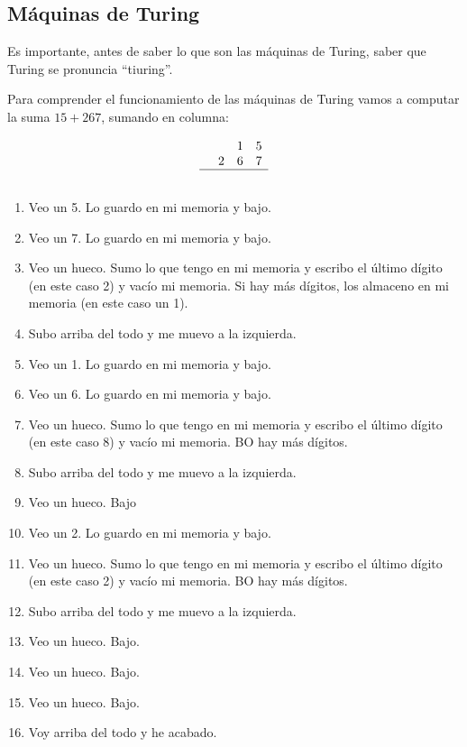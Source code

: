 
\subsection{Máquinas de Turing}

Es importante, antes de saber lo que son las máquinas de Turing, saber que Turing se pronuncia ``tiuring''.

\begin{example}
Para comprender el funcionamiento de las máquinas de Turing vamos a computar la suma $15 + 267$, sumando en columna:

\[
\begin{array}{cccc}
&&1&5\\
&2&6&7\\\hline
&&&
\end{array}
\]

\begin{enumerate}
	\item Veo un 5. Lo guardo en mi memoria y bajo.
	\item Veo un 7. Lo guardo en mi memoria y bajo.
	\item Veo un hueco. Sumo lo que tengo en mi memoria y escribo el último dígito (en este caso 2) y vacío mi memoria. Si hay más dígitos, los almaceno en mi memoria (en este caso un 1).
	\item Subo arriba del todo y me muevo a la izquierda.
	\item Veo un 1. Lo guardo en mi memoria y bajo.
	\item Veo un 6. Lo guardo en mi memoria y bajo.
	\item Veo un hueco. Sumo lo que tengo en mi memoria y escribo el último dígito (en este caso 8) y vacío mi memoria. BO hay más dígitos.
	\item Subo arriba del todo y me muevo a la izquierda.
	\item Veo un hueco. Bajo
	\item Veo un 2. Lo guardo en mi memoria y bajo.
	\item Veo un hueco. Sumo lo que tengo en mi memoria y escribo el último dígito (en este caso 2) y vacío mi memoria. BO hay más dígitos.
	\item Subo arriba del todo y me muevo a la izquierda.
	\item Veo un hueco. Bajo.
	\item Veo un hueco. Bajo.
	\item Veo un hueco. Bajo.
	\item Voy arriba del todo y he acabado.
\end{enumerate}
\end{example}

